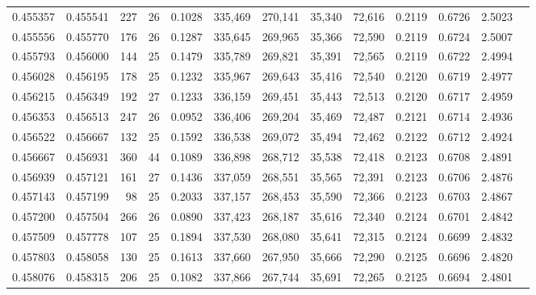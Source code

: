\begin{tabular}{rrrrrrrrrrrrr}
0.455357 & 0.455541 &    227 &    26 &                                     0.1028 & 335,469 & 270,141 &  35,340 &  72,616 & 0.2119 & 0.6726 & 2.5023 \\
0.455556 & 0.455770 &    176 &    26 &                                     0.1287 & 335,645 & 269,965 &  35,366 &  72,590 & 0.2119 & 0.6724 & 2.5007 \\
0.455793 & 0.456000 &    144 &    25 &                                     0.1479 & 335,789 & 269,821 &  35,391 &  72,565 & 0.2119 & 0.6722 & 2.4994 \\
0.456028 & 0.456195 &    178 &    25 &                                     0.1232 & 335,967 & 269,643 &  35,416 &  72,540 & 0.2120 & 0.6719 & 2.4977 \\
0.456215 & 0.456349 &    192 &    27 &                                     0.1233 & 336,159 & 269,451 &  35,443 &  72,513 & 0.2120 & 0.6717 & 2.4959 \\
0.456353 & 0.456513 &    247 &    26 &                                     0.0952 & 336,406 & 269,204 &  35,469 &  72,487 & 0.2121 & 0.6714 & 2.4936 \\
0.456522 & 0.456667 &    132 &    25 &                                     0.1592 & 336,538 & 269,072 &  35,494 &  72,462 & 0.2122 & 0.6712 & 2.4924 \\
0.456667 & 0.456931 &    360 &    44 &                                     0.1089 & 336,898 & 268,712 &  35,538 &  72,418 & 0.2123 & 0.6708 & 2.4891 \\
0.456939 & 0.457121 &    161 &    27 &                                     0.1436 & 337,059 & 268,551 &  35,565 &  72,391 & 0.2123 & 0.6706 & 2.4876 \\
0.457143 & 0.457199 &     98 &    25 &                                     0.2033 & 337,157 & 268,453 &  35,590 &  72,366 & 0.2123 & 0.6703 & 2.4867 \\
0.457200 & 0.457504 &    266 &    26 &                                     0.0890 & 337,423 & 268,187 &  35,616 &  72,340 & 0.2124 & 0.6701 & 2.4842 \\
0.457509 & 0.457778 &    107 &    25 &                                     0.1894 & 337,530 & 268,080 &  35,641 &  72,315 & 0.2124 & 0.6699 & 2.4832 \\
0.457803 & 0.458058 &    130 &    25 &                                     0.1613 & 337,660 & 267,950 &  35,666 &  72,290 & 0.2125 & 0.6696 & 2.4820 \\
0.458076 & 0.458315 &    206 &    25 &                                     0.1082 & 337,866 & 267,744 &  35,691 &  72,265 & 0.2125 & 0.6694 & 2.4801 \\

\end{tabular}
